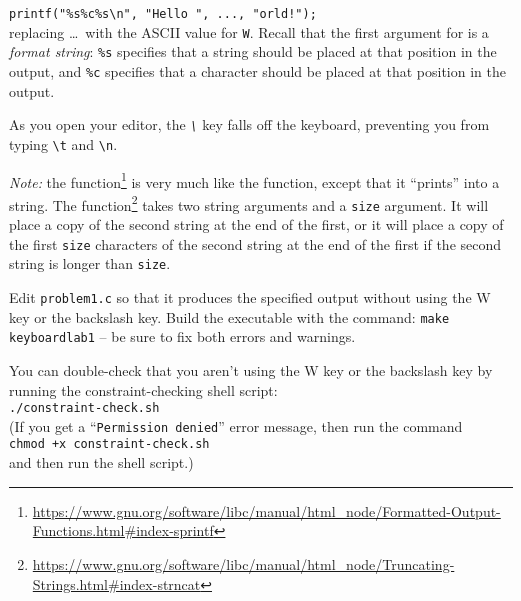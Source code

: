 \lstinline{printf("%s%c%s\n", "Hello ", ..., "orld!");} \\
replacing \dots\ with the ASCII value for \texttt{W}.
Recall that the first argument for  is a \textit{format string}: \texttt{\%s} specifies that a string should be placed at that position in the output, and \texttt{\%c} specifies that a character should be placed at that position in the output.

As you open your editor, the \textit{\texttt{\textbackslash}} key falls off the keyboard, preventing you from typing \texttt{\textbackslash t} and \texttt{\textbackslash n}.

\textit{Note: } the  function\footnote{\url{https://www.gnu.org/software/libc/manual/html_node/Formatted-Output-Functions.html\#index-sprintf}} is very much like the  function, except that it ``prints'' into a string.
The  function\footnote{\url{https://www.gnu.org/software/libc/manual/html_node/Truncating-Strings.html\#index-strncat}} takes two string arguments and a \lstinline{size} argument.
It will place a copy of the second string at the end of the first, or it will place a copy of the first \lstinline{size} characters of the second string at the end of the first if the second string is longer than \lstinline{size}.

Edit \texttt{problem1.c} so that it produces the specified output without using the W key or the backslash key.
Build the executable with the command: \texttt{make keyboardlab1} -- be sure to fix both errors and warnings.

You can double-check that you aren't using the W key or the backslash key by running the constraint-checking shell script: \\
\texttt{./constraint-check.sh} \\
(If you get a ``\texttt{Permission denied}'' error message, then run the command \\
\texttt{chmod +x constraint-check.sh} \\
and then run the shell script.)

